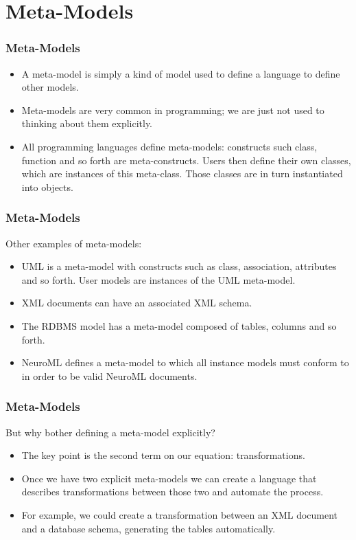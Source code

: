 \documentclass{beamer}
\begin{document}
\section{Meta-Models}

\begin{frame}
\frametitle{Meta-Models}

\begin{itemize}
\item A meta-model is simply a kind of model used to define a
  language to define other models.
  \pause
\item Meta-models are very common in programming; we are just not used
  to thinking about them explicitly.
  \pause
\item All programming languages define meta-models: constructs such
  class, function and so forth are meta-constructs. Users then define
  their own classes, which are instances of this meta-class. Those
  classes are in turn instantiated into objects.
\end{itemize}

\end{frame}

\begin{frame}
\frametitle{Meta-Models}

Other examples of meta-models:

\begin{itemize}
  \item UML is a meta-model with constructs such as class,
    association, attributes and so forth. User models are instances of
    the UML meta-model.
    \pause
  \item XML documents can have an associated XML schema.
    \pause
  \item The RDBMS model has a meta-model composed of tables, columns
    and so forth.
    \pause
  \item NeuroML defines a meta-model to which all instance models
      must conform to in order to be valid NeuroML documents.
\end{itemize}

\end{frame}

\begin{frame}
\frametitle{Meta-Models}

But why bother defining a meta-model explicitly?
\pause

\begin{itemize}
  \item The key point is the second term on our equation:
    transformations.
    \pause
  \item Once we have two explicit meta-models we can create a language
    that describes transformations between those two and automate the
    process.
    \pause
  \item For example, we could create a transformation between an XML
    document and a database schema, generating the tables
    automatically.
\end{itemize}

\end{frame}
\end{document}
